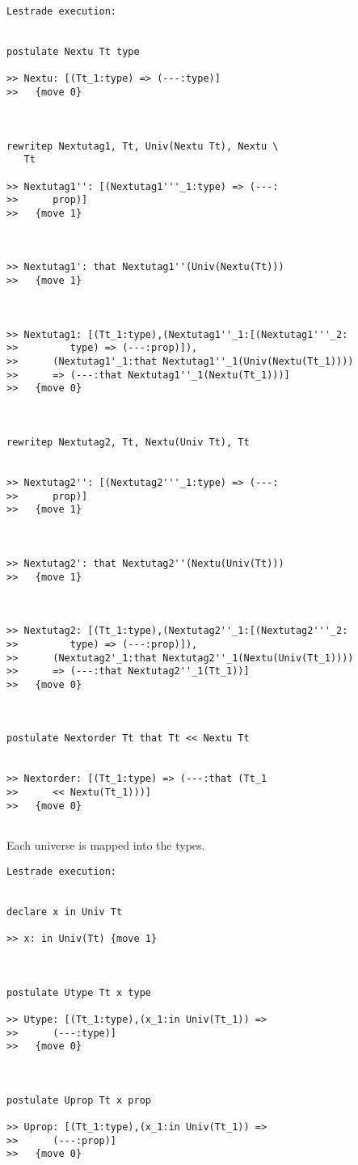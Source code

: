 \documentclass{article}
\begin{document}
\begin{verbatim}Lestrade execution:


postulate Nextu Tt type

>> Nextu: [(Tt_1:type) => (---:type)]
>>   {move 0}



rewritep Nextutag1, Tt, Univ(Nextu Tt), Nextu \
   Tt

>> Nextutag1'': [(Nextutag1'''_1:type) => (---:
>>      prop)]
>>   {move 1}



>> Nextutag1': that Nextutag1''(Univ(Nextu(Tt)))
>>   {move 1}



>> Nextutag1: [(Tt_1:type),(Nextutag1''_1:[(Nextutag1'''_2:
>>         type) => (---:prop)]),
>>      (Nextutag1'_1:that Nextutag1''_1(Univ(Nextu(Tt_1))))
>>      => (---:that Nextutag1''_1(Nextu(Tt_1)))]
>>   {move 0}



rewritep Nextutag2, Tt, Nextu(Univ Tt), Tt


>> Nextutag2'': [(Nextutag2'''_1:type) => (---:
>>      prop)]
>>   {move 1}



>> Nextutag2': that Nextutag2''(Nextu(Univ(Tt)))
>>   {move 1}



>> Nextutag2: [(Tt_1:type),(Nextutag2''_1:[(Nextutag2'''_2:
>>         type) => (---:prop)]),
>>      (Nextutag2'_1:that Nextutag2''_1(Nextu(Univ(Tt_1))))
>>      => (---:that Nextutag2''_1(Tt_1))]
>>   {move 0}



postulate Nextorder Tt that Tt << Nextu Tt


>> Nextorder: [(Tt_1:type) => (---:that (Tt_1
>>      << Nextu(Tt_1)))]
>>   {move 0}


\end{verbatim}

Each universe is mapped into the types.

\begin{verbatim}Lestrade execution:


declare x in Univ Tt

>> x: in Univ(Tt) {move 1}



postulate Utype Tt x type

>> Utype: [(Tt_1:type),(x_1:in Univ(Tt_1)) =>
>>      (---:type)]
>>   {move 0}



postulate Uprop Tt x prop

>> Uprop: [(Tt_1:type),(x_1:in Univ(Tt_1)) =>
>>      (---:prop)]
>>   {move 0}


\end{verbatim}
\end{document}
